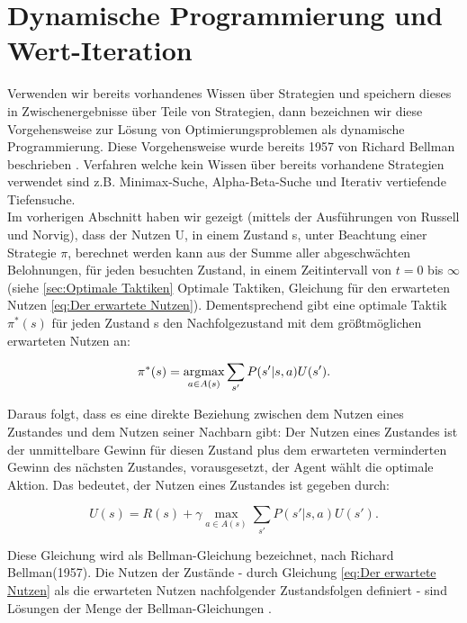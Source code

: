 \section{Dynamische Programmierung und Wert-Iteration}
\label{sec:Wert-Iteration}
Verwenden wir bereits vorhandenes Wissen über Strategien und speichern dieses in Zwischenergebnisse über Teile von Strategien, dann bezeichnen wir diese Vorgehensweise zur Lösung von Optimierungsproblemen als dynamische Programmierung. Diese Vorgehensweise wurde bereits 1957 von Richard Bellman beschrieben \cite[293]{Ertel}. Verfahren welche kein Wissen über bereits vorhandene Strategien verwendet sind z.B. Minimax-Suche, Alpha-Beta-Suche und Iterativ vertiefende Tiefensuche.\\

Im vorherigen Abschnitt haben wir gezeigt (mittels der Ausführungen von Russell und Norvig), dass der Nutzen U, in einem Zustand s, unter Beachtung einer Strategie $\pi$, berechnet werden kann aus der Summe aller abgeschwächten Belohnungen, für jeden besuchten Zustand, in einem Zeitintervall von $t = 0$ bis $\infty$ (siehe \ref{sec:Optimale Taktiken} Optimale Taktiken, Gleichung für den erwarteten Nutzen \ref{eq:Der erwartete Nutzen}). Dementsprechend gibt eine optimale Taktik $\pi^*(s)$ für jeden Zustand s den Nachfolgezustand mit dem größtmöglichen erwarteten Nutzen an:

\begin{equation}
\pi^*(s) = \operatorname*{arg\!\max}_{a \in A(s)} \sum_{s'} P(s'|s, a) U(s').
\end{equation}

Daraus folgt, dass es eine direkte Beziehung zwischen dem Nutzen eines Zustandes und dem Nutzen seiner Nachbarn gibt: Der Nutzen eines Zustandes ist der unmittelbare Gewinn für diesen Zustand plus dem erwarteten verminderten Gewinn des nächsten Zustandes, vorausgesetzt, der Agent wählt die optimale Aktion. Das bedeutet, der Nutzen eines Zustandes ist gegeben durch:

\begin{equation}
U(s) = R(s) + \gamma \max_{a \in A(s)} \sum_{s'} P(s'|s, a) U(s').
\end{equation}

Diese Gleichung wird als Bellman-Gleichung bezeichnet, nach Richard Bellman(1957). Die Nutzen der Zustände - durch Gleichung \ref{eq:Der erwartete Nutzen} als die erwarteten Nutzen nachfolgender Zustandsfolgen definiert - sind Lösungen der Menge der Bellman-Gleichungen \cite[759]{Russell}.

